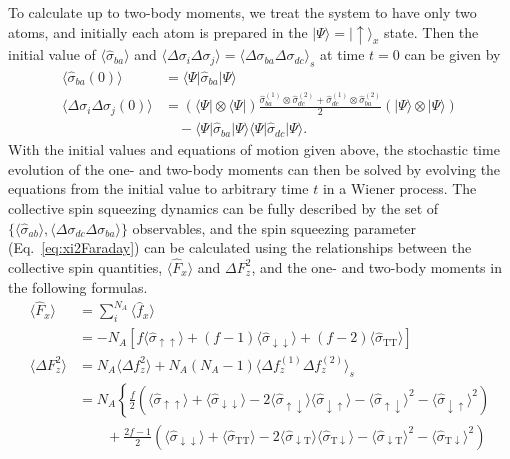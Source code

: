 \documentclass[preprint,aps,pra,onecolumn,superscriptaddress]{revtex4-1} %
\def\bra#1{\langle{#1}\rvert}%
\def\ket#1{\lvert{#1}\rangle}%
\newcommand{\nn}{\nonumber}
\newcommand{\expect}[1]{\big\langle #1 \big\rangle}
\newcommand{\sigmauu}{\hat{\sigma}_{\uparrow\uparrow}}
\newcommand{\sigmaud}{\hat{\sigma}_{\uparrow\downarrow}}
\newcommand{\sigmadu}{\hat{\sigma}_{\downarrow\uparrow}}
\newcommand{\sigmadd}{\hat{\sigma}_{\downarrow\downarrow}}
\newcommand{\sigmadt}{\hat{\sigma}_{\downarrow \mathrm{T}}}
\newcommand{\sigmatd}{\hat{\sigma}_{\mathrm{T}\downarrow}}
\newcommand{\sigmatt}{\hat{\sigma}_{\mathrm{T}\mathrm{T}}}
\begin{document}
\begin{appendix}
To calculate up to two-body moments, we treat the system to have only two atoms, and initially each atom is prepared in the $ \ket{\Psi}=\ket{\uparrow}_x $ state. Then the initial value of $ \expect{\hat{\sigma}_{ba} } $ and $ \expect{\Delta\sigma_i\Delta\sigma_j}=\expect{\Delta\sigma_{ba}\Delta\sigma_{dc}}_s $ at time $ t=0 $ can be given by
\begin{subequations}
\begin{align}
\expect{\hat{\sigma}_{ba}(0)}&=\bra{\Psi}\hat{\sigma}_{ba}\ket{\Psi}\\
\expect{\Delta\sigma_i\Delta\sigma_j(0)} &= (\bra{\Psi}\otimes\bra{\Psi})\frac{\hat{\sigma}_{ba}^{(1)} \otimes\hat{\sigma}_{dc}^{(2)}+\hat{\sigma}_{dc}^{(1)} \otimes\hat{\sigma}_{ba}^{(2)}}{2}(\ket{\Psi}\otimes\ket{\Psi})\nn\\
&\quad-\bra{\Psi}\hat{\sigma}_{ba}\ket{\Psi}\bra{\Psi}\hat{\sigma}_{dc}\ket{\Psi}.
\end{align}
\end{subequations}
With the initial values and equations of motion given above, the stochastic time evolution of the one- and two-body moments can then be solved by evolving the equations from the initial value to arbitrary time $ t $ in a Wiener process. The collective spin squeezing dynamics can be fully described by the set of $ \{\expect{\hat{\sigma}_{ab}},\expect{\Delta\sigma_{dc}\Delta\sigma_{ba}}\} $ observables, and the spin squeezing parameter (Eq.~\eqref{eq:xi2Faraday}) can be calculated using the relationships between the collective spin quantities, $ \expect{\hat{F}_x} $ and $ \Delta F_z^2 $, and the one- and two-body moments in the following formulas. 
\begin{subequations}
	\begin{align}
	\expect{\hat{F}_x} &= \sum_i^{N_A}\expect{\hat{f}_x}\nonumber\\
	&= -N_A \left[f\expect{\sigmauu}+(f-1)\expect{\sigmadd}+(f-2)\expect{\sigmatt } \right]\label{eq:Fx_qutrit}\\
	\expect{\Delta F_z^2} &= N_A\expect{\Delta f_z^2} + N_A(N_A-1)\expect{\Delta f_z^{(1)}\Delta f_z^{(2)} }_s\nn\\
	&=N_A\left\{ \frac{f}{2}\left(\expect{\sigmauu}+\expect{\sigmadd}-2\expect{\sigmaud}\expect{\sigmadu}-\expect{\sigmaud}^2-\expect{\sigmadu}^2 \right)\right. \label{eq:DeltaFz2_fz}\\
	&\quad\quad+ \frac{2f-1}{2}\left(\expect{\sigmadd}+\expect{\sigmatt}-2\expect{\sigmadt}\expect{\sigmatd}-\expect{\sigmadt}^2-\expect{\sigmatd}^2 \right)\nn\\

\end{align}
\end{subequations}
\end{appendix}
\end{document}
